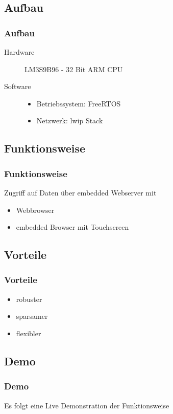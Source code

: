 \documentclass{beamer}
\begin{document}
\subsection{Aufbau}
\begin{frame}\frametitle{Aufbau}
  \begin{description}
    \item [Hardware] LM3S9B96 - 32 Bit ARM CPU
    \item [Software] 
      \begin{itemize}
        \item Betriebssystem: FreeRTOS
        \item Netzwerk: lwip Stack
      \end{itemize}
  \end{description}
\end{frame}

\subsection{Funktionsweise}
\begin{frame}\frametitle{Funktionsweise}
Zugriff auf Daten über embedded Webserver mit
  \begin{itemize}
    \item Webbrowser
    \item embedded Browser mit Touchscreen
  \end{itemize}
\end{frame}


\subsection{Vorteile}
\begin{frame}\frametitle{Vorteile}
  \begin{itemize}
    \item robuster
    \item sparsamer
    \item flexibler
  \end{itemize}
\end{frame}

\subsection{Demo}
\begin{frame}\frametitle{Demo}
  Es folgt eine Live Demonstration der Funktionsweise
\end{frame}
\end{document}
